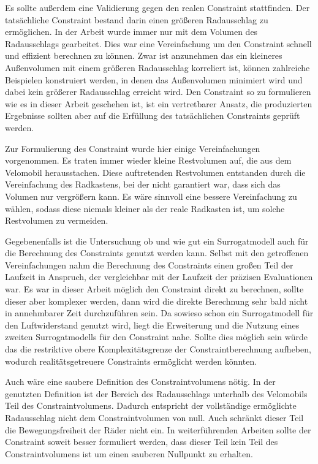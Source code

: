 Es sollte außerdem eine Validierung gegen den realen Constraint stattfinden.
Der tatsächliche Constraint bestand darin einen größeren Radausschlag zu ermöglichen.
In der Arbeit wurde immer nur mit dem Volumen des Radausschlags gearbeitet.
Dies war eine Vereinfachung um den Constraint schnell und effizient berechnen zu können.
Zwar ist anzunehmen das ein kleineres Außenvolumen mit einem größeren Radausschlag korreliert ist, können zahlreiche Beispielen konstruiert werden, in denen das Außenvolumen minimiert wird und dabei kein größerer Radausschlag erreicht wird.
Den Constraint so zu formulieren wie es in dieser Arbeit geschehen ist, ist ein vertretbarer Ansatz, die produzierten Ergebnisse sollten aber auf die Erfüllung des tatsächlichen Constraints geprüft werden.

Zur Formulierung des Constraint wurde hier einige Vereinfachungen vorgenommen.
Es traten immer wieder kleine Restvolumen auf, die aus dem Velomobil herausstachen.
Diese auftretenden Restvolumen entstanden durch die Vereinfachung des Radkastens, bei der nicht garantiert war, dass sich das Volumen nur vergrößern kann.
Es wäre sinnvoll eine bessere Vereinfachung zu wählen, sodass diese niemals kleiner als der reale Radkasten ist, um solche Restvolumen zu vermeiden.

Gegebenenfalls ist die Untersuchung ob und wie gut ein Surrogatmodell auch für die Berechnung des Constraints genutzt werden kann.
Selbst mit den getroffenen Vereinfachungen nahm die Berechnung des Constraints einen großen Teil der Laufzeit in Anspruch, der vergleichbar mit der Laufzeit der präzisen Evaluationen war.
Es war in dieser Arbeit möglich den Constraint direkt zu berechnen, sollte dieser aber komplexer werden, dann wird die direkte Berechnung sehr bald nicht in annehmbarer Zeit durchzuführen sein.
Da sowieso schon ein Surrogatmodell für den Luftwiderstand genutzt wird, liegt die Erweiterung und die Nutzung eines zweiten Surrogatmodells für den Constraint nahe.
Sollte dies möglich sein würde das die restriktive obere Komplexitätsgrenze der Constraintberechnung aufheben, wodurch realitätsgetreuere Constraints ermöglicht werden könnten. 

Auch wäre eine saubere Definition des Constraintvolumens nötig.
In der genutzten Definition ist der Bereich des Radausschlags unterhalb des Velomobils Teil des Constraintvolumens.
Dadurch entspricht der vollständige ermöglichte Radausschlag nicht dem Constraintvolumen von null.
Auch schränkt dieser Teil die Bewegungsfreiheit der Räder nicht ein.
In weiterführenden Arbeiten sollte der Constraint soweit besser formuliert werden, dass dieser Teil kein Teil des Constraintvolumens ist um einen sauberen Nullpunkt zu erhalten.


